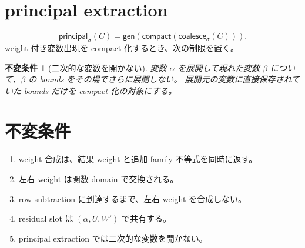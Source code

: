 \documentclass[uplatex,dvipdfmx,a4paper,11pt]{jsarticle}
\theoremstyle{jpplain}
\newtheorem{invariant}[definition]{不変条件}
\newcommand{\gen}{\mathsf{gen}}
\newcommand{\principal}{\mathsf{principal}}
\newcommand{\compact}{\mathsf{compact}}
\newcommand{\coalesce}{\mathsf{coalesce}}
\begin{document}
\section{principal extraction}

\[
  \principal_{\sigma}(C)
  =\gen(\compact(\coalesce_{\sigma}(C))).
\]
weight 付き変数出現を compact 化するとき、次の制限を置く。

\begin{invariant}[二次的な変数を開かない]
変数 \(\alpha\) を展開して現れた変数 \(\beta\) について、\(\beta\) の bounds をその場でさらに展開しない。
展開元の変数に直接保存されていた bounds だけを compact 化の対象にする。
\end{invariant}

\section{不変条件}

\begin{enumerate}
  \item weight 合成は、結果 weight と追加 family 不等式を同時に返す。
  \item 左右 weight は関数 domain で交換される。
  \item row subtraction に到達するまで、左右 weight を合成しない。
  \item residual slot は \((\alpha,U,W')\) で共有する。
  \item principal extraction では二次的な変数を開かない。
\end{enumerate}
\end{document}
